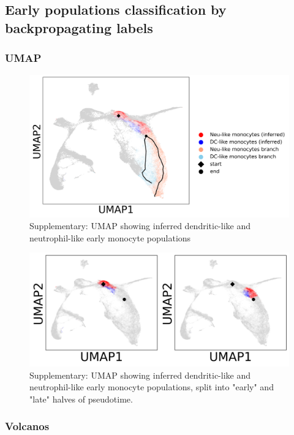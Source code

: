 \documentclass[a4paper]{article}
\begin{document}
\FloatBarrier
\subsection{Early populations classification by backpropagating labels}

\subsubsection{UMAP}
\begin{figure}[!htb]
  \centering
  \includegraphics[width=\textwidth]{../figures/hematopoiesis/early_groups_umap.png}
  \caption{Supplementary: UMAP showing inferred dendritic-like and neutrophil-like early monocyte populations }
\end{figure}

\begin{figure}[!htb]
  \centering
  \includegraphics[width=\textwidth]{../figures/hematopoiesis/early_groups_umap_split.png}
  \caption{Supplementary: UMAP showing inferred dendritic-like and neutrophil-like early monocyte populations, split into "early" and "late" halves of pseudotime. }
\end{figure}

\FloatBarrier
\subsubsection{Volcanos}
\end{document}
